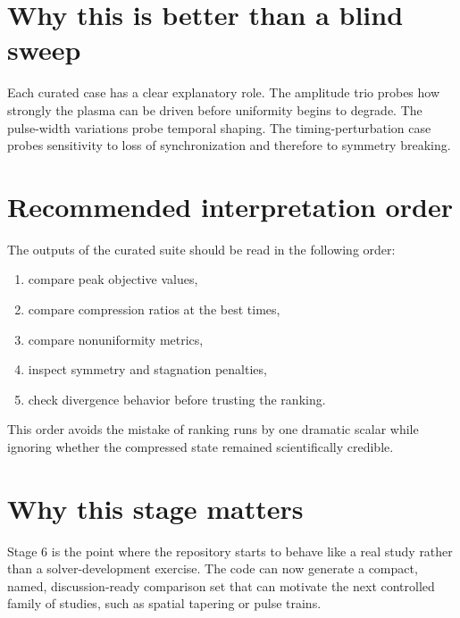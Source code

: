 \documentclass[11pt]{article}
\begin{document}
\section{Why this is better than a blind sweep}
Each curated case has a clear explanatory role. The amplitude trio probes how strongly the plasma can be driven before uniformity begins to degrade. The pulse-width variations probe temporal shaping. The timing-perturbation case probes sensitivity to loss of synchronization and therefore to symmetry breaking.

\section{Recommended interpretation order}
The outputs of the curated suite should be read in the following order:
\begin{enumerate}[leftmargin=1.8em]
    \item compare peak objective values,
    \item compare compression ratios at the best times,
    \item compare nonuniformity metrics,
    \item inspect symmetry and stagnation penalties,
    \item check divergence behavior before trusting the ranking.
\end{enumerate}
This order avoids the mistake of ranking runs by one dramatic scalar while ignoring whether the compressed state remained scientifically credible.

\section{Why this stage matters}
Stage 6 is the point where the repository starts to behave like a real study rather than a solver-development exercise. The code can now generate a compact, named, discussion-ready comparison set that can motivate the next controlled family of studies, such as spatial tapering or pulse trains.
\end{document}

